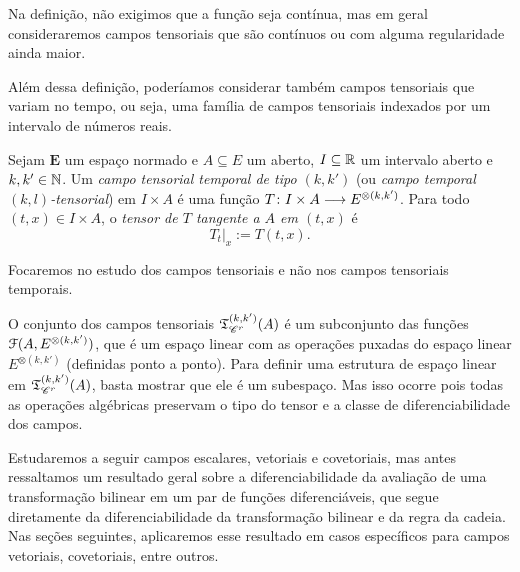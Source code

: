 Na definição, não exigimos que a função seja contínua, mas em geral consideraremos campos tensoriais que são contínuos ou com alguma regularidade ainda maior.

Além dessa definição, poderíamos considerar também campos tensoriais que variam no tempo, ou seja, uma família de campos tensoriais indexados por um intervalo de números reais.

\begin{definition}
Sejam $\bm E$ um espaço normado e $A \subseteq E$ um aberto, $I \subseteq \mathbb{R}$ um intervalo aberto e $k,k' \in \mathbb{N}$. Um \emph{campo tensorial temporal de tipo $(k,k')$} (ou \emph{campo temporal $(k,l)$-tensorial}) em $I \times A$ é uma função $T\colon \allowbreak I \times A \longrightarrow E^{\otimes(k,k')}$. Para todo $(t,x) \in I \times A$, o \emph{tensor de $T$ tangente a $A$ em $(t,x)$} é
	\begin{equation*}
	T_t|_x := T(t,x).
	\end{equation*}
\end{definition}

Focaremos no estudo dos campos tensoriais e não nos campos tensoriais temporais.

O conjunto dos campos tensoriais $\mathfrak{T}^{(k,k')}_{\mathscr{C}^r}(A)$ é um subconjunto das funções $\mathcal{F}(A, E^{\otimes(k,k')})$, que é um espaço linear com as operações puxadas do espaço linear $E^{\otimes(k,k')}$ (definidas ponto a ponto). Para definir uma estrutura de espaço linear em  $\mathfrak{T}^{(k,k')}_{\mathscr{C}^r}(A)$, basta mostrar que ele é um subespaço. Mas isso ocorre pois todas as operações algébricas preservam o tipo do tensor e a classe de diferenciabilidade dos campos.

Estudaremos a seguir campos escalares, vetoriais e covetoriais, mas antes ressaltamos um resultado geral sobre a diferenciabilidade da avaliação de uma transformação bilinear em um par de funções diferenciáveis, que segue diretamente da diferenciabilidade da transformação bilinear e da regra da cadeia. Nas seções seguintes, aplicaremos esse resultado em casos específicos para campos vetoriais, covetoriais, entre outros.

